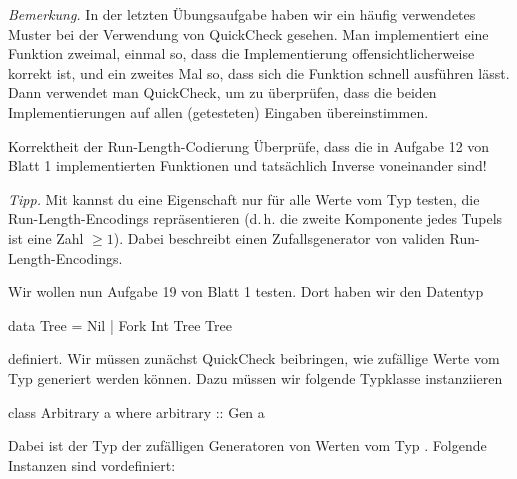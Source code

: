 \documentclass{uebblatt}
\newcommand{\refaufgabe}[1]{#1} %
\begin{document}
\emph{Bemerkung.} In der letzten Übungsaufgabe haben wir ein häufig verwendetes
Muster bei der Verwendung von QuickCheck gesehen. Man implementiert eine
Funktion zweimal, einmal so, dass die Implementierung offensichtlicherweise
korrekt ist, und ein zweites Mal so, dass sich die Funktion schnell ausführen
lässt. Dann verwendet man QuickCheck, um zu überprüfen, dass die beiden
Implementierungen auf allen (getesteten) Eingaben übereinstimmen.

\begin{aufgabe}{Korrektheit der Run-Length-Codierung}
  Überprüfe, dass die in Aufgabe \refaufgabe{12} von Blatt 1 implementierten
  Funktionen  und  tatsächlich
  Inverse voneinander sind!

  {\scriptsize \emph{Tipp.} Mit  kannst du eine Eigenschaft nur
  für alle Werte vom Typ 
  testen, die Run-Length-Encodings repräsentieren (d.\,h. die zweite Komponente
  jedes Tupels ist eine Zahl $\geq 1$). Dabei beschreibt
   einen Zufallsgenerator von validen
  Run-Length-Encodings.}
\end{aufgabe}

Wir wollen nun Aufgabe \refaufgabe{19} von Blatt 1 testen. Dort haben wir den
Datentyp

\begin{haskellcode}
data Tree = Nil | Fork Int Tree Tree
\end{haskellcode}

definiert. Wir müssen zunächst QuickCheck beibringen, wie zufällige Werte vom Typ  generiert werden können. Dazu müssen wir folgende Typklasse instanziieren

\begin{haskellcode}
class Arbitrary a where
  arbitrary :: Gen a
\end{haskellcode}

Dabei ist  der Typ der zufälligen Generatoren von Werten
vom Typ . Folgende Instanzen sind vordefiniert:

\end{document}
